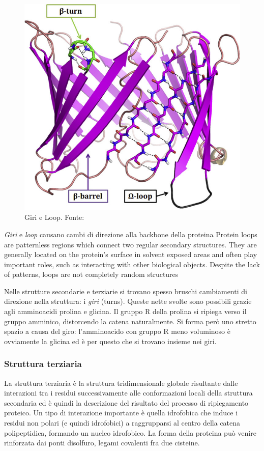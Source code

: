 \begin{figure}[!htp]
	\centering
	\includegraphics[scale=1.1]{images/turn-loop.jpg}
	\caption{Giri e Loop. Fonte: \cite{MURRAY2017477}}
	\label{fig:turn-loops}
\end{figure}


\par \textit{Giri} e \textit{loop} causano cambi di direzione alla backbone della proteina
Protein loops are patternless regions which connect two regular secondary structures. They are generally located on the protein's surface in solvent exposed areas and often play important roles, such as interacting with other biological objects. Despite the lack of patterns, loops are not completely random structures

\par Nelle strutture secondarie e terziarie si trovano spesso bruschi cambiamenti di direzione nella struttura: i \textit{giri} (turns). Queste nette svolte sono possibili grazie agli amminoacidi prolina e glicina. Il gruppo R della prolina si ripiega verso il gruppo amminico, distorcendo la catena naturalmente. Si forma però uno stretto spazio a causa del giro: l'amminoacido con gruppo R meno voluminoso è ovviamente la glicina ed è per questo che si trovano insieme nei giri.

\subsubsection{Struttura terziaria}
La struttura terziaria è la struttura tridimensionale globale risultante dalle interazioni tra i residui successivamente alle conformazioni locali della struttura secondaria ed è quindi la descrizione del risultato del processo di ripiegamento proteico. Un tipo di interazione importante è quella idrofobica che induce i residui non polari (e quindi idrofobici) a raggrupparsi al centro della catena polipeptidica, formando un nucleo idrofobico. La forma della proteina può venire rinforzata dai ponti disolfuro, legami covalenti fra due cisteine.


